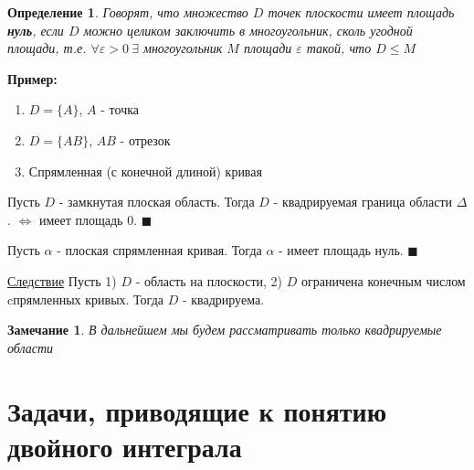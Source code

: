 \documentclass[a4paper, 14pt]{report}
\newtheorem{defenition}{Определение}[chapter]
\newtheorem{note}{Замечание}[chapter]
\begin{document}
	\hfill
	
    \begin{defenition}
        Говорят, что множество $D$ точек плоскости имеет площадь \textbf{нуль}, если $D$ можно целиком заключить в многоугольник, сколь угодной площади, т.е. $\forall \varepsilon > 0\ \exists$ многоугольник $M$ площади $\varepsilon$ такой, что $D \le M$
    \end{defenition}
	
	\hfill
	
	\textbf{Пример:}
	\begin{enumerate}
		\item[1)] $D = \{ A \}$, $A$ - точка
		\item[2)] $D = \{ AB \}$, $AB$ - отрезок
		\item[3)] Спрямленная (с конечной длиной) кривая
	\end{enumerate}
	
    \begin{theorem}
        Пусть $D$ - замкнутая плоская область. Тогда $D$ - квадрируемая граница области $\Delta$. $\Leftrightarrow$ имеет площадь 0. $\blacksquare$
    \end{theorem}
	
	\hfill
	
    \begin{theorem}
        Пусть $\alpha$ - плоская спрямленная кривая. Тогда $\alpha$ - имеет площадь нуль. $\blacksquare$
    \end{theorem}
	
	\hfill
	
	\underline{Следствие} Пусть 1) $D$ - область на плоскости, 2) $D$ ограничена конечным числом cпрямленных кривых. Тогда $D$ - квадрируема.
	
	\hfill
	
    \begin{note}
        В дальнейшем мы будем рассматривать только квадрируемые области
    \end{note}
	
	\section{Задачи, приводящие к понятию двойного интеграла}
	
\end{document}
